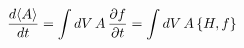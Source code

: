 \documentclass[preview]{standalone}
\begin{document}
\begin{align*}
\special{dvisvgm:raw <g id='unique000'>}\dv{\langle A\rangle}{t}=\int dV\,A\,\pdv{f}{t}=\int dV\,A\,\pb{H}{f}\special{dvisvgm:raw </g>}
\end{align*}
\end{document}
